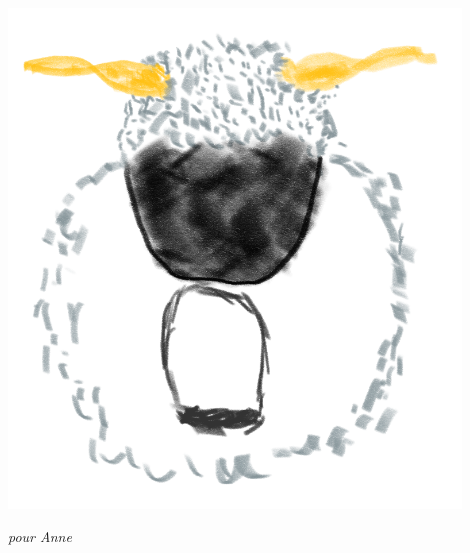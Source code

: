\thispagestyle{empty}
\cleardoublepage
\thispagestyle{empty}

\null{}
\hfill%
\begin{center}
\includegraphics[width=0.9\textwidth]{0_style/maeh.png}
\end{center}
\vspace{2cm}
\begin{center}
\textit{pour Anne}
\end{center}

\clearpage{ \thispagestyle{empty} \cleardoublepage}
